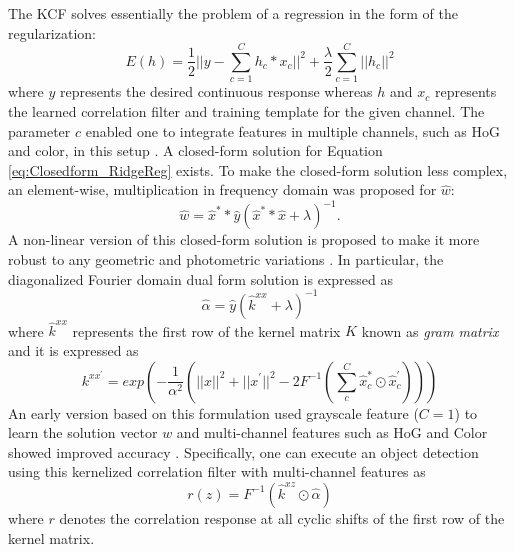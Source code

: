 \documentclass{bmvc2k}
\begin{document}
The KCF solves essentially the problem of a regression in the form of
the regularization:
\begin{equation}
E(h) = \frac{1}{2}||y-\sum_{c=1}^{C}h_{c}*x_{c}||^{2} + \frac{\lambda}{2}\sum_{c=1}^{C}||h_{c}||^{2}
\label{eq:Closedform_RidgeReg}
\end{equation}
where $y$ represents the desired continuous response whereas $h$ and
$x_{c}$ represents the learned correlation filter and training
template for the given channel. The parameter $c$ enabled one to
integrate features in multiple channels, such as HoG and color, in
this setup \cite{henriques2015high,galoogahi2013multi}. A closed-form
solution for Equation \ref{eq:Closedform_RidgeReg} exists. To make the
closed-form solution less complex, an element-wise, multiplication in
frequency domain was proposed for $\hat{w}$:
\begin{equation}
\hat{w} = \hat{x}^{*}*\hat{y}(\hat{x}^{*}*\hat{x}+\lambda)^{-1}.
\label{eq:DiagonalizedPrimalSolution}
\end{equation}
A non-linear version of this closed-form solution is proposed to make
it more robust to any geometric and photometric variations
\cite{henriques2015high}. In particular, the diagonalized Fourier
domain dual form solution is expressed as
\begin{equation}
\hat{\alpha} = \hat{y}(\hat{k}^{xx}+\lambda)^{-1}
\label{eq:FourierDualDomainSolution}
\end{equation}
where $\hat{k}^{xx}$ represents the first row of the kernel matrix $K$
known as \textit{gram matrix} and it is expressed as
\begin{equation}
k^{xx^{'}} = exp(-\dfrac{1}{\alpha^{2}}(||x||^{2}+||x^{'}||^{2}-2F^{-1}(\sum^{C}_{c}\hat{x}_{c}^{*}\odot \hat{x}_{c}^{'})))
\label{eq:GaussianCorrelationSingleChannel}
\end{equation}
An early version based on this formulation used grayscale feature
($C=1$) to learn the solution vector $w$ and multi-channel features
such as HoG and Color showed improved accuracy
\cite{henriques2015high,galoogahi2013multi,tang2015multi,ma2015long,bibi2015multi}. Specifically,
one can execute an object detection using this kernelized correlation
filter with multi-channel features as 
\begin{equation}
r(z) = F^{-1}(\hat{k}^{xz} \odot \hat{\alpha})
\end{equation}
where $r$ denotes the correlation response at all cyclic shifts of the
first row of the kernel matrix.
\end{document}
